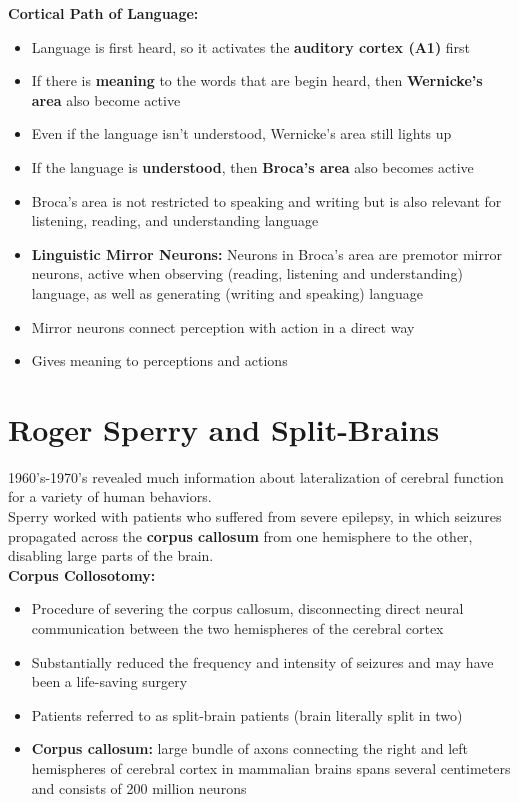 \documentclass{article}
\begin{document}
\newpage
\noindent \textbf{Cortical Path of Language:}
\begin{itemize}
    \item Language is first heard, so it activates the \textbf{auditory cortex (A1)} first
    \item If there is \textbf{meaning} to the words that are begin heard, then \textbf{Wernicke's area} also become active
    \item Even if the language isn't understood, Wernicke's area still lights up
    \item If the language is \textbf{understood}, then \textbf{Broca's area} also becomes active
    \item Broca's area is not restricted to speaking and writing but is also relevant for listening, reading, and understanding language
    \item \textbf{Linguistic Mirror Neurons:} Neurons in Broca's area are premotor mirror neurons, active when observing (reading, listening and understanding) language, as well as generating (writing and speaking) language
    \item Mirror neurons connect perception with action in a direct way
    \item Gives meaning to perceptions and actions 
\end{itemize}


\section{Roger Sperry and Split-Brains}
1960's-1970's revealed much information about lateralization of cerebral function for a variety of human behaviors. \\

Sperry worked with patients who suffered from severe epilepsy, in which seizures propagated across the \textbf{corpus callosum} from one hemisphere to the other, disabling large parts of the brain. \\ 

\noindent\textbf{Corpus Collosotomy:}
\begin{itemize}
    \item Procedure of severing the corpus callosum, disconnecting direct neural communication between the two hemispheres of the cerebral cortex
    \item Substantially reduced the frequency and intensity of seizures and may have been a life-saving surgery
    \item Patients referred to as split-brain patients (brain literally split in two)
    \item \textbf{Corpus callosum:} large bundle of axons connecting the right and left hemispheres of cerebral cortex in mammalian brains
        \subitem spans several centimeters and consists of 200 million neurons
\end{itemize}
\end{document}
